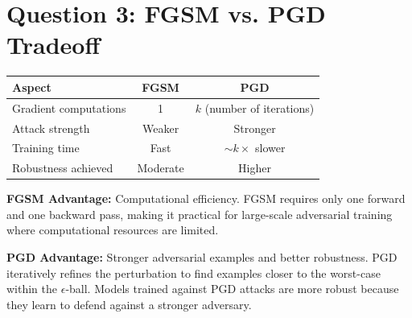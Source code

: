 \documentclass[11pt]{article}
\begin{document}
\section{Question 3: FGSM vs. PGD Tradeoff}

\begin{table}[h]
\centering
\begin{tabular}{lcc}
\toprule
\textbf{Aspect} & \textbf{FGSM} & \textbf{PGD} \\
\midrule
Gradient computations & 1 & $k$ (number of iterations) \\
Attack strength & Weaker & Stronger \\
Training time & Fast & $\sim k\times$ slower \\
Robustness achieved & Moderate & Higher \\
\bottomrule
\end{tabular}
\end{table}

\textbf{FGSM Advantage:} Computational efficiency. FGSM requires only one forward and one backward pass, making it practical for large-scale adversarial training where computational resources are limited.

\textbf{PGD Advantage:} Stronger adversarial examples and better robustness. PGD iteratively refines the perturbation to find examples closer to the worst-case within the $\epsilon$-ball. Models trained against PGD attacks are more robust because they learn to defend against a stronger adversary.
\end{document}
